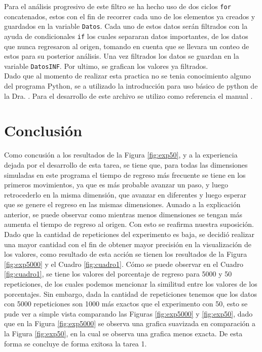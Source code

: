 \documentclass{article}
\begin{document}
Para el análisis progresivo de este filtro se ha hecho uso de dos ciclos \texttt{for} concatenados, estos con el fin de recorrer cada uno de los elementos ya creados y guardados en la variable \texttt{Datos}. Cada uno de estos datos serán filtrados con la ayuda de condicionales \texttt{if} los cuales separaran datos importantes, de los datos que nunca regresaron al origen, tomando en cuenta que se llevara un conteo de estos para su posterior análisis. Una vez filtrados los datos  se guardan en la variable \texttt{DatosINF}. Por ultimo, se grafican los valores ya filtrados.\\


Dado que al momento de realizar esta practica no se tenia conocimiento alguno del programa Python, se a utilizado la introducción para uso básico de python de la Dra. \citet{DRA.COM.USOBASICO}. Para el desarrollo de este archivo se utilizo como referencia el manual \citep{manual.python}.



\section{Conclusión}



Como concusión a los resultados de la Figura \ref{fig:exp50}, y a la experiencia dejada por el desarrollo de esta tarea, se tiene que, para todas las dimensiones simuladas en este programa el tiempo de regreso más frecuente se tiene en los primeros movimientos, ya que es más probable avanzar un paso, y luego retrocederlo en la misma dimensión, que avanzar en diferentes y luego esperar que se genere el regreso en las mismas dimensiones. Aunado a la explicación anterior, se puede observar como mientras menos dimensiones se tengan más aumenta el tiempo de regreso al origen. Con esto se reafirma nuestra suposición. Dado que la cantidad de repeticiones del experimento es baja, se decidió realizar una mayor cantidad con el fin de obtener mayor precisión en la visualización de los valores, como resultado de esta acción se tienen los resultados de la Figura \ref{fig:exp5000} y el Cuadro \ref{fig:cuadro1}. Cómo se puede observar en el Cuadro \ref{fig:cuadro1}, se tiene los valores del porcentaje de regreso para 5000 y 50 repeticiones, de los cuales podemos mencionar la similitud entre los valores de los porcentajes. Sin embargo, dada la cantidad de repeticiones tenemos que los datos con 5000 repeticiones son 1000 más exactos que el experimento con 50, esto se pude ver a simple vista comparando las Figuras \ref{fig:exp5000} y \ref{fig:exp50}, dado que en la Figura \ref{fig:exp5000} se observa una grafica suavizada en comparación a la Figura \ref{fig:exp50}, en la cual se observa una grafica menos exacta. De esta forma se concluye de forma exitosa la tarea 1.   \\
\end{document}
